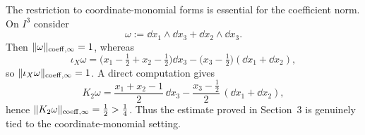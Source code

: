 \begin{remark}
\label{rem:non-coord-monomial}
The restriction to coordinate-monomial forms is essential for the coefficient
norm. On $I^3$ consider
\[
\omega:=\dd x_1\wedge \dd x_3+\dd x_2\wedge \dd x_3.
\]
Then $\lVert \omega \rVert_{\mathrm{coeff},\infty}=1$, whereas
\[
\iota_X\omega
=
\bigl(x_1-\tfrac12+x_2-\tfrac12\bigr)\dd x_3
-\bigl(x_3-\tfrac12\bigr)(\dd x_1+\dd x_2),
\]
so $\lVert \iota_X\omega \rVert_{\mathrm{coeff},\infty}=1$. A direct computation gives
\[
K_2\omega
=
\frac{x_1+x_2-1}{2}\,\dd x_3
-\frac{x_3-\tfrac12}{2}\,(\dd x_1+\dd x_2),
\]
hence $\lVert K_2\omega \rVert_{\mathrm{coeff},\infty}=\frac12>\frac14$. Thus the estimate
proved in Section~3 is genuinely tied to the coordinate-monomial setting.
\end{remark}

